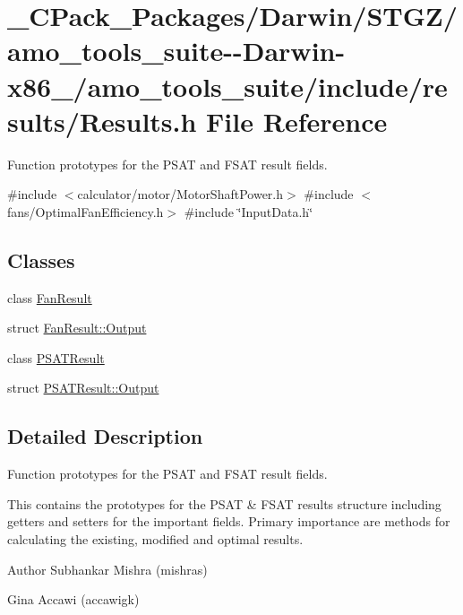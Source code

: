 \hypertarget{___c_pack___packages_2_darwin_2_s_t_g_z_2amo__tools__suite--_darwin-x86__64_2amo__tools__suite_2include_2results_2_results_8h}{}\section{\+\_\+\+C\+Pack\+\_\+\+Packages/\+Darwin/\+S\+T\+G\+Z/amo\+\_\+tools\+\_\+suite-\/-\/\+Darwin-\/x86\+\_/amo\+\_\+tools\+\_\+suite/include/results/\+Results.h File Reference}
\label{___c_pack___packages_2_darwin_2_s_t_g_z_2amo__tools__suite--_darwin-x86__64_2amo__tools__suite_2include_2results_2_results_8h}


Function prototypes for the P\+S\+AT and F\+S\+AT result fields.  


{\ttfamily \#include $<$calculator/motor/\+Motor\+Shaft\+Power.\+h$>$}\newline
{\ttfamily \#include $<$fans/\+Optimal\+Fan\+Efficiency.\+h$>$}\newline
{\ttfamily \#include \char`\"{}Input\+Data.\+h\char`\"{}}\newline
\subsection*{Classes}
\begin{DoxyCompactItemize}
\item 
class \hyperlink{class_fan_result}{Fan\+Result}
\item 
struct \hyperlink{struct_fan_result_1_1_output}{Fan\+Result\+::\+Output}
\item 
class \hyperlink{class_p_s_a_t_result}{P\+S\+A\+T\+Result}
\item 
struct \hyperlink{struct_p_s_a_t_result_1_1_output}{P\+S\+A\+T\+Result\+::\+Output}
\end{DoxyCompactItemize}


\subsection{Detailed Description}
Function prototypes for the P\+S\+AT and F\+S\+AT result fields. 

This contains the prototypes for the P\+S\+AT \& F\+S\+AT results structure including getters and setters for the important fields. Primary importance are methods for calculating the existing, modified and optimal results.

\begin{DoxyAuthor}{Author}
Subhankar Mishra (mishras) 

Gina Accawi (accawigk) 
\end{DoxyAuthor}

